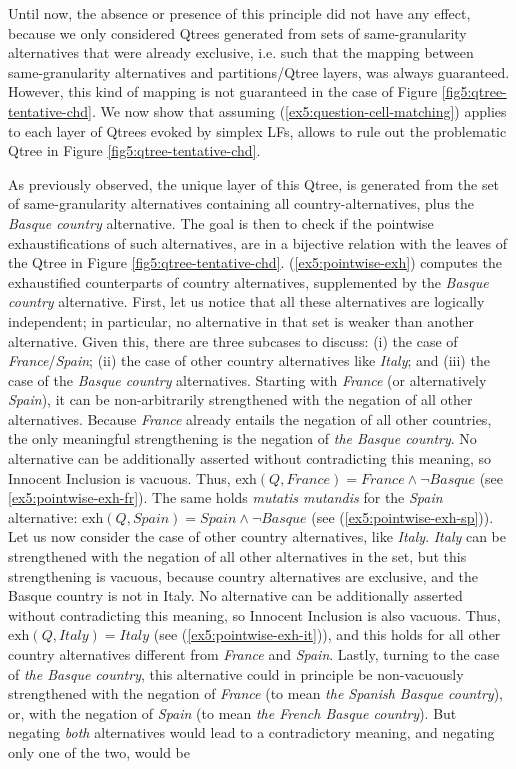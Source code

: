 Until now, the absence or presence of this principle did not have any effect, because we only considered Qtrees generated from sets of same-granularity alternatives that were already exclusive, i.e. such that the mapping between same-granularity alternatives and partitions/Qtree layers, was always guaranteed. However, this kind of mapping is not guaranteed in the case of Figure \ref{fig5:qtree-tentative-chd}. We now show that assuming (\ref{ex5:question-cell-matching}) applies to each layer of Qtrees evoked by simplex LFs, allows to rule out the problematic Qtree in Figure \ref{fig5:qtree-tentative-chd}.

As previously observed, the unique layer of this Qtree, is generated from the set of same-granularity alternatives containing all country-alternatives, plus the \textit{Basque country} alternative. The goal is then to check if the pointwise exhaustifications of such alternatives, are in a bijective relation with the leaves of the Qtree in Figure \ref{fig5:qtree-tentative-chd}. (\ref{ex5:pointwise-exh}) computes the exhaustified counterparts of country alternatives, supplemented by the \textit{Basque country} alternative. First, let us notice that all these alternatives are logically independent; in particular, no alternative in that set is weaker than another alternative. Given this, there are three subcases to discuss: (i) the case of \textit{France}/\textit{Spain}; (ii) the case of other country alternatives like \textit{Italy}; and (iii) the case of the \textit{Basque country} alternatives. Starting with \textit{France} (or alternatively \textit{Spain}), it can be non-arbitrarily strengthened with the negation of all other alternatives. Because \textit{France} already entails the negation of all other countries, the only meaningful strengthening is the negation of \textit{the Basque country}. No alternative can be additionally asserted without contradicting this meaning, so Innocent Inclusion is vacuous. Thus, $\text{exh}(Q, \textit{France}) = \textit{France}\wedge\neg\textit{Basque}$ (see \ref{ex5:pointwise-exh-fr}). The same holds \textit{mutatis mutandis} for the \textit{Spain} alternative: $\text{exh}(Q, \textit{Spain}) = \textit{Spain}\wedge\neg\textit{Basque}$ (see (\ref{ex5:pointwise-exh-sp})). Let us now consider the case of other country alternatives, like \textit{Italy}. \textit{Italy} can be strengthened with the negation of all other alternatives in the set, but this strengthening is vacuous, because country alternatives are exclusive, and the Basque country is not in Italy. No alternative can be additionally asserted without contradicting this meaning, so Innocent Inclusion is also vacuous. Thus, $\text{exh}(Q, \textit{Italy}) = \textit{Italy}$ (see (\ref{ex5:pointwise-exh-it})), and this holds for all other country alternatives different from \textit{France} and \textit{Spain}. Lastly, turning to  the case of \textit{the Basque country}, this alternative could in principle be non-vacuously strengthened with the negation of \textit{France} (to mean \textit{the Spanish Basque country}), or, with the negation of \textit{Spain} (to mean \textit{the French Basque country}). But negating \textit{both} alternatives would lead to a contradictory meaning, and negating only one of the two, would be 